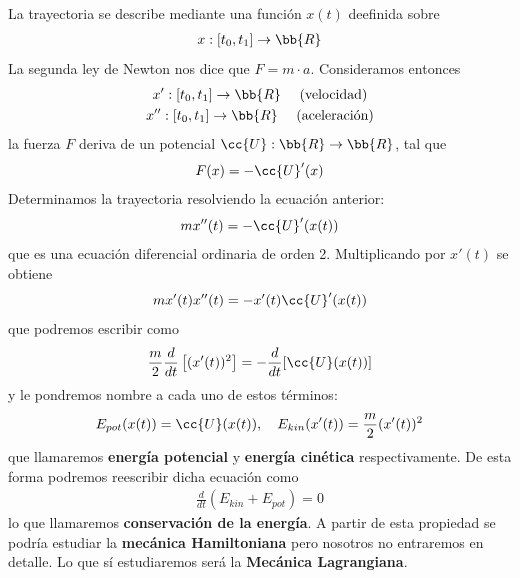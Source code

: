 La trayectoria se describe mediante una función $x(t)$ deefinida sobre
\begin{gather*}
    x:[t_0,t_1] \to \bb{R}
\end{gather*}
La segunda ley de Newton nos dice que $F=m\cdot a$. Consideramos entonces 
\begin{gather*}
    x':[t_0,t_1] \to \bb{R} \ \ \ \ \text{(velocidad)}\\
    x'':[t_0,t_1] \to \bb{R} \ \ \ \ \text{(aceleración)}
\end{gather*}
la fuerza $F$ deriva de un potencial $\cc{U}:\bb{R} \to \bb{R}$, tal que 
\begin{gather*}
    F(x) = -\cc{U}'(x)
\end{gather*}
Determinamos la trayectoria resolviendo la ecuación anterior:
\begin{gather*}
    mx''(t) = -\cc{U}'(x(t))
\end{gather*}
que es una ecuación diferencial ordinaria de orden 2. Multiplicando por $x'(t)$ se obtiene
\begin{gather*}
    mx'(t)x''(t) = -x'(t) \cc{U}'(x(t))
\end{gather*}
que podremos escribir como 
\begin{gather*}
    \frac{m}{2} \frac{d}{dt}\left[ (x'(t))^2 \right] = -\frac{d}{dt}[\cc{U}(x(t))]
\end{gather*}
y le pondremos nombre a cada uno de estos términos:
\begin{gather*}
    E_{pot}(x(t)) = \cc{U}(x(t)),\ \ \ E_{kin}(x'(t)) = \frac{m}{2}(x'(t))^2
\end{gather*}
que llamaremos \textbf{energía potencial} y \textbf{energía cinética} respectivamente. De esta forma podremos reescribir dicha ecuación como 
\begin{gather*}
    \frac{d}{dt}(E_{kin} + E_{pot}) = 0
\end{gather*}
lo que llamaremos \textbf{conservación de la energía}. A partir de esta propiedad se podría estudiar la \textbf{mecánica Hamiltoniana} pero nosotros no entraremos en detalle. Lo que sí estudiaremos será la \textbf{Mecánica Lagrangiana}.\\

